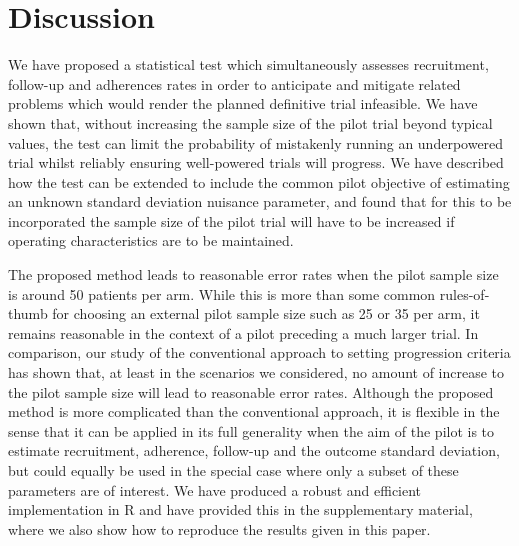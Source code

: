 \documentclass[AMA,STIX1COL]{WileyNJD-v2}
\begin{document}

\section{Discussion}\label{sec:discussion}

We have proposed a statistical test which simultaneously assesses recruitment, follow-up and adherences rates in order to anticipate and mitigate related problems which would render the planned definitive trial infeasible. We have shown that, without increasing the sample size of the pilot trial beyond typical values, the test can limit the probability of mistakenly running an underpowered trial whilst reliably ensuring well-powered trials will progress. We have described how the test can be extended to include the common pilot objective of estimating an unknown standard deviation nuisance parameter, and found that for this to be incorporated the sample size of the pilot trial will have to be increased if operating characteristics are to be maintained.


The proposed method leads to reasonable error rates when the pilot sample size is around 50 patients per arm. While this is more than some common rules-of-thumb for choosing an external pilot sample size such as 25 \cite{Whitehead2015} or 35 \cite{Teare2014} per arm, it remains reasonable in the context of a pilot preceding a much larger trial. In comparison, our study of the conventional approach to setting progression criteria has shown that, at least in the scenarios we considered, no amount of increase to the pilot sample size will lead to reasonable error rates. Although the proposed method is more complicated than the conventional approach, it is flexible in the sense that it can be applied in its full generality when the aim of the pilot is to estimate recruitment, adherence, follow-up and the outcome standard deviation, but could equally be used in the special case where only a subset of these parameters are of interest. We have produced a robust and efficient implementation in R and have provided this in the supplementary material, where we also show how to reproduce the results given in this paper.
\end{document}
